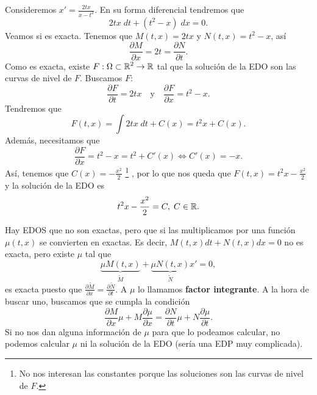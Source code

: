 \begin{eg}
Consideremos $\displaystyle x' = \frac{2tx}{x - t ^{2}} $. En su forma diferencial tendremos que
\[2tx \; dt +\left(t ^{2}-x\right) \; dx = 0 .\]
Veamos si es exacta. Tenemos que $\displaystyle M\left(t,x\right)=2tx $ y $\displaystyle N\left(t,x\right)=t ^{2}-x $, así
\[\frac{\partial M}{\partial x}=2t = \frac{\partial N}{\partial t} .\]
Como es exacta, existe $\displaystyle F : \Omega\subset \mathbb{R}^{2} \to \mathbb{R} $ tal que la solución de la EDO son las curvas de nivel de $\displaystyle F $. Buscamos $\displaystyle F $:
\[\frac{\partial F}{\partial t}= 2tx \quad \text{y} \quad \frac{\partial F}{\partial x} = t ^{2}-x .\]
Tendremos que 
\[ F\left(t,x\right)=\int 2tx \; dt + C\left(x\right)= t ^{2}x + C\left(x\right) .\]
Además, necesitamos que 
\[\frac{\partial F}{\partial x}=t ^{2}-x=t ^{2}+ C'\left(x\right) \iff C'\left(x\right)=-x .\]
Así, tenemos que $\displaystyle C\left(x\right)=-\frac{x^{2}}{2} $ \footnote{No nos interesan las constantes porque las soluciones son las curvas de nivel de $\displaystyle F $.} , por lo que nos queda que $\displaystyle F\left(t,x\right)=t ^{2}x - \frac{x^{2}}{2} $ y la solución de la EDO es
\[ t ^{2}x - \frac{x^{2}}{2} = C, \; C \in \mathbb{R}.\]
\end{eg}
\begin{observation}
Hay EDOS que no son exactas, pero que si las multiplicamos por una función $\displaystyle \mu\left(t,x\right) $ se convierten en exactas. Es decir, $\displaystyle M\left(t,x\right)dt + N\left(t,x\right)dx=0 $ no es exacta, pero existe $\displaystyle \mu $ tal que 
\[\underbrace{\mu M\left(t,x\right)}_{\widetilde{M}} + \underbrace{\mu N\left(t,x\right)}_{\tilde{N}} x' = 0 ,\]
es exacta puesto que $\displaystyle \frac{\partial \widetilde{M}}{\partial x}= \frac{\partial \tilde{N}}{\partial t} $. A $\displaystyle \mu $ lo llamamos \textbf{factor integrante}. A la hora de buscar uno, buscamos que se cumpla la condición
\[\frac{\partial M}{\partial x}\mu + M\frac{\partial \mu}{\partial x}= \frac{\partial N}{\partial t}\mu + N\frac{\partial \mu}{\partial t} .\]
Si no nos dan alguna información de $\displaystyle \mu $ para que lo podeamos calcular, no podemos calcular $\displaystyle \mu $ ni la solución de la EDO (sería una EDP muy complicada).
\end{observation}

